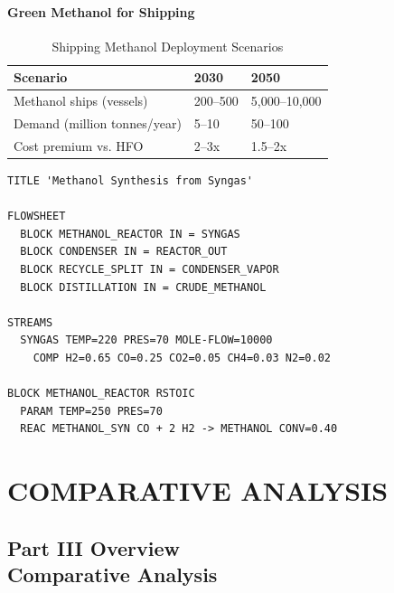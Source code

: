 \documentclass[12pt,twoside,openany]{book}
\let\cleardoublepage\clearpage
\begin{document}
\subsection{Green Methanol for Shipping}

\begin{table}[htbp]
    \centering
    \caption{Shipping Methanol Deployment Scenarios}
    \label{tab:shipping_methanol}
    \begin{tabular}{L{4cm} C{3cm} C{3cm}}
    \hline
    \textbf{Scenario} & \textbf{2030} & \textbf{2050} \\
    \hline
    Methanol ships (vessels) & 200--500 & 5,000--10,000 \\
    Demand (million tonnes/year) & 5--10 & 50--100 \\
    Cost premium vs. HFO & 2--3x & 1.5--2x \\
    \hline
    \end{tabular}
\end{table}

\begin{lstlisting}[language={}, caption={Methanol Synthesis Aspen Plus Input}]
TITLE 'Methanol Synthesis from Syngas'

FLOWSHEET
  BLOCK METHANOL_REACTOR IN = SYNGAS
  BLOCK CONDENSER IN = REACTOR_OUT
  BLOCK RECYCLE_SPLIT IN = CONDENSER_VAPOR
  BLOCK DISTILLATION IN = CRUDE_METHANOL

STREAMS
  SYNGAS TEMP=220 PRES=70 MOLE-FLOW=10000
    COMP H2=0.65 CO=0.25 CO2=0.05 CH4=0.03 N2=0.02

BLOCK METHANOL_REACTOR RSTOIC
  PARAM TEMP=250 PRES=70
  REAC METHANOL_SYN CO + 2 H2 -> METHANOL CONV=0.40
\end{lstlisting}


\part{COMPARATIVE ANALYSIS}

\cleardoublepage
{}
\chapter*{Part III Overview\\Comparative Analysis}
\end{document}
